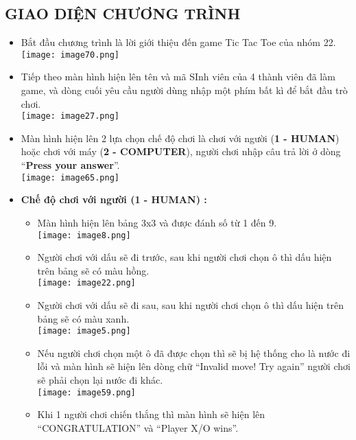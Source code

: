 \subsection*{\textbf{\large GIAO DIỆN CHƯƠNG TRÌNH}}
\begin{itemize}
    \item Bắt đầu chương trình là lời giới thiệu đến game Tic Tac Toe của nhóm 22.\\
    \texttt{[image: image70.png]}
    \item Tiếp theo màn hình hiện lên tên và mã SInh viên của 4 thành viên đã làm game, và dòng cuối yêu cầu người dùng nhập một phím bất kì để bắt đầu trò chơi.\\
    \texttt{[image: image27.png]}
    \item Màn hình hiện lên 2 lựa chọn chế độ chơi là chơi với người (\textbf{1 - HUMAN}) hoặc chơi với máy (\textbf{2 - COMPUTER}), người chơi nhập câu trả lời ở dòng “\textbf{Press your answer}”.\\
    \texttt{[image: image65.png]}
    \item \textbf{Chế độ chơi với người (1 - HUMAN) :}
    \begin{itemize}
        \item Màn hình hiện lên bảng 3x3 và được đánh số từ 1 đến 9.\\
        \texttt{[image: image8.png]}
        \item Người chơi với dấu  sẽ đi trước, sau khi người chơi  chọn ô thì dấu  hiện trên bảng sẽ có màu hồng.\\
        \texttt{[image: image22.png]}
        \item Người chơi với dấu  sẽ đi sau, sau khi người chơi  chọn ô thì dấu  hiện trên bảng sẽ có màu xanh.\\
        \texttt{[image: image5.png]}
        \item Nếu người chơi chọn một ô đã được chọn thì sẽ bị hệ thống cho là nước đi lỗi và  màn hình sẽ hiện lên dòng chữ “Invalid move! Try again” người chơi sẽ phải chọn lại nước đi khác.\\
        \texttt{[image: image59.png]}
        \item Khi 1 người chơi chiến thắng thì màn hình sẽ hiện lên “CONGRATULATION” và “Player X/O wins”.\\

\end{itemize}
\end{itemize}
